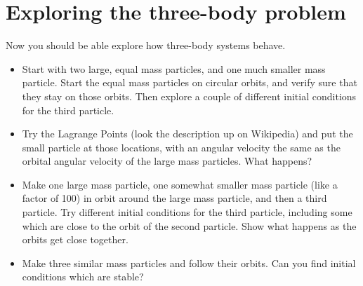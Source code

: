 \documentclass[11pt, preprint]{aastex}
\begin{document}
\section{Exploring the three-body problem}

Now you should be able explore how three-body systems behave. 

\begin{itemize}
\item Start with two large, equal mass particles, and one much smaller
  mass particle. Start the equal mass particles on circular orbits,
  and verify sure that they stay on those orbits. Then explore a
  couple of different initial conditions for the third particle.
\item Try the Lagrange Points (look the description up on Wikipedia)
  and put the small particle at those locations, with an angular
  velocity the same as the orbital angular velocity of the large mass
  particles. What happens?
\item Make one large mass particle, one somewhat smaller mass particle
  (like a factor of 100) in orbit around the large mass particle, and
  then a third particle. Try different initial conditions for the
  third particle, including some which are close to the orbit of the
  second particle. Show what happens as the orbits get close together.
\item Make three similar mass particles and follow their orbits. Can
  you find initial conditions which are stable? 
\end{itemize}
\end{document}
